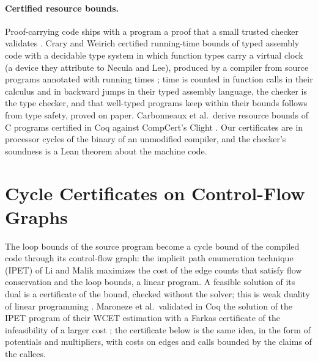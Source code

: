 \documentclass[oneside,english]{amsart}
\numberwithin{equation}{section}
\theoremstyle{plain}
\theoremstyle{definition}
\theoremstyle{plain}
\theoremstyle{plain}
\theoremstyle{remark}
\begin{document}
\paragraph{Certified resource bounds.} Proof-carrying code ships with a program a proof that a small trusted checker validates \cite{necula1997proof}. Crary and Weirich certified running-time bounds of typed assembly code with a decidable type system in which function types carry a virtual clock (a device they attribute to Necula and Lee), produced by a compiler from source programs annotated with running times \cite{crary2000resource}; time is counted in function calls in their calculus and in backward jumps in their typed assembly language, the checker is the type checker, and that well-typed programs keep within their bounds follows from type safety, proved on paper. Carbonneaux et al.\ derive resource bounds of C programs certified in Coq against CompCert's Clight \cite{carbonneaux2015compositional}. Our certificates are in processor cycles of the binary of an unmodified compiler, and the checker's soundness is a Lean theorem about the machine code.

\section{Cycle Certificates on Control-Flow Graphs}
\label{sec:graphs}

The loop bounds of the source program become a cycle bound of the compiled code through its control-flow graph: the implicit path enumeration technique (IPET) of Li and Malik \cite{li1995ilp} maximizes the cost of the edge counts that satisfy flow conservation and the loop bounds, a linear program. A feasible solution of its dual is a certificate of the bound, checked without the solver; this is weak duality of linear programming \cite{schrijver1986theory}. Maroneze et al.\ validated in Coq the solution of the IPET program of their WCET estimation with a Farkas certificate of the infeasibility of a larger cost \cite{maroneze2014formally}; the certificate below is the same idea, in the form of potentials and multipliers, with costs on edges and calls bounded by the claims of the callees.
\end{document}
